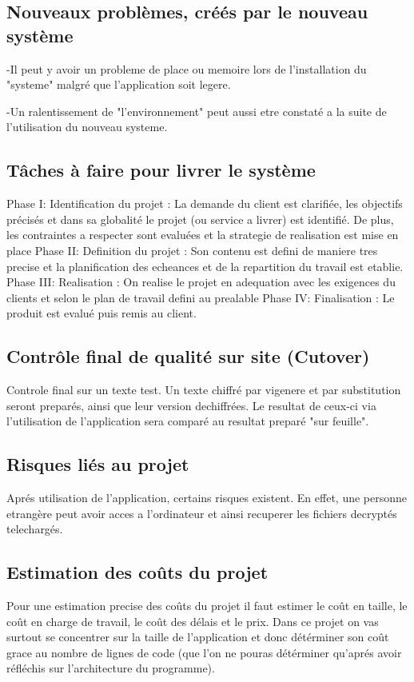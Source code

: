 \documentclass[a4]{article}
\begin{document}
		\subsection{Nouveaux problèmes, créés par le nouveau système}
		-Il peut y avoir un probleme de place ou memoire lors de l'installation du "systeme" malgré que l'application 			soit legere.
		
		-Un ralentissement de "l'environnement" peut aussi etre constaté a la suite de l'utilisation du nouveau 			systeme.
		\subsection{Tâches à faire pour livrer le système}
		Phase I: Identification du projet : La demande du client est clarifiée, les objectifs précisés et dans sa 			globalité le projet (ou service a livrer) est identifié. De plus, les contraintes a respecter sont 				evaluées et la strategie de realisation est mise en place
		Phase II: Definition du projet : Son contenu est defini de maniere tres precise et la planification des 			echeances et de la repartition du travail est etablie.
		Phase III: Realisation : On realise le projet en adequation avec les exigences du clients et selon le plan de 			travail defini au prealable
		Phase IV: Finalisation : Le produit est evalué puis remis au client.
		
		
		
		\subsection{Contrôle final de qualité sur site (Cutover)}
		Controle final sur un texte test. Un texte chiffré par vigenere et par substitution seront preparés, ainsi que 			leur version dechiffrées. Le resultat de ceux-ci via l'utilisation de l'application sera comparé au resultat 				preparé "sur feuille". 
		\subsection{Risques liés au projet}
		Aprés utilisation de l'application, certains risques existent. En effet, une personne etrangère peut avoir 			acces a l'ordinateur et ainsi recuperer les fichiers decryptés telechargés.
		\subsection{Estimation des coûts du projet}
		 	Pour une estimation precise des coûts du projet il faut estimer le coût en taille, 
			le coût en charge de travail, le coût des délais et le prix. Dans ce projet on vas surtout 
			se concentrer sur la taille de l'application et donc détérminer son coût grace au nombre de 
			lignes de code (que l'on ne pouras détérminer qu'aprés avoir réfléchis sur l'architecture du 				programme).		  		
\end{document}
